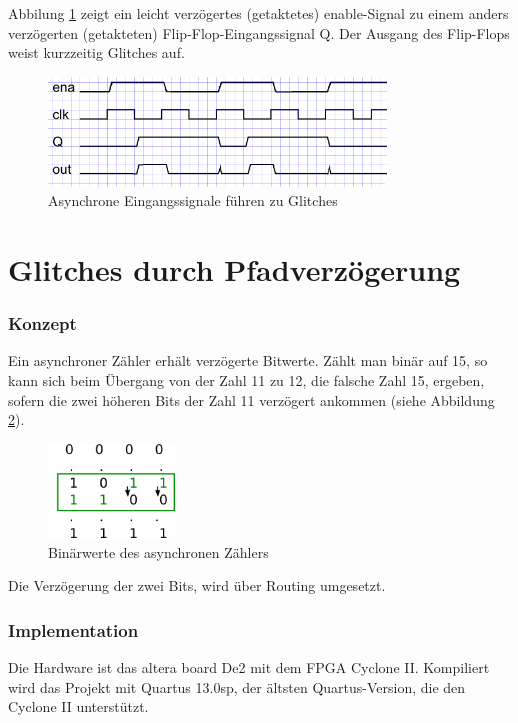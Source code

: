 Abbilung \ref{fig.glitch.bild1} zeigt ein leicht verzögertes (getaktetes) enable-Signal zu einem anders verzögerten (getakteten) Flip-Flop-Eingangssignal Q. Der Ausgang des Flip-Flops weist kurzzeitig Glitches auf. \\
\begin{figure}[H]
	\includegraphics[width=0.8\textwidth]{images/glitch/def_glitch_3.png}
	\caption{Asynchrone Eingangssignale führen zu Glitches}
	\label{fig.glitch.bild1}
\end{figure}


\newpage
\section{Glitches durch Pfadverzögerung}\label{sect.glitch_detect}


\subsubsection{Konzept}
Ein asynchroner Zähler erhält verzögerte Bitwerte. Zählt man binär auf 15, so kann sich beim Übergang von der Zahl 11 zu 12, die falsche Zahl 15, ergeben, sofern die zwei höheren Bits der Zahl 11 verzögert ankommen (siehe Abbildung \ref {fig.glitch.binaer_zahlen}).

\begin{figure}[H]
	\includegraphics[width=0.3\textwidth]{images/glitch/konzept_verzoegerung.png}
	\caption{Binärwerte des asynchronen Zählers}
	\label{fig.glitch.binaer_zahlen}
\end{figure}

Die Verzögerung der zwei Bits, wird über Routing umgesetzt. 



\subsubsection{Implementation} 
Die Hardware ist das altera board De2 mit dem FPGA Cyclone II. Kompiliert wird das Projekt mit Quartus 13.0sp, der ältsten Quartus-Version, die den Cyclone II unterstützt.

